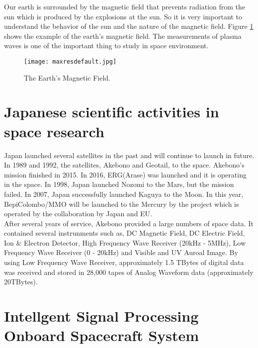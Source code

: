 Our earth is surrounded by the magnetic field that prevents radiation from the sun which is produced by the explosions at the sun. So it is very important to understand the behavior of the sun and the nature of the magnetic field. Figure \ref{fig:magField} shows the example of the earth's magnetic field. The measurements of plasma waves is one of the important thing to study in space environment.\\
\begin{figure}[h!]
  \texttt{[image: maxresdefault.jpg]}
  \caption{The Earth's Magnetic Field.}
  \label{fig:magField}
   \cite{magEarth}
\end{figure}

\section*{Japanese scientific activities in space research}
Japan launched several satellites in the past and will continue to launch in future. In 1989 and 1992, the satellites, Akebono and Geotail, to the space. Akebono's mission finished in 2015. In 2016, ERG(Arase) was launched and it is operating in the space. In 1998, Japan launched Nozomi to the Mars, but the mission failed. In 2007, Japan successfully launched Kaguya to the Moon. In this year, BepiColombo/MMO will be launched to the Mercury by the project which is operated by the collaboration by Japan and EU\cite{lecture}.\\
After several years of service, Akebono provided a large numbers of space data. It contained several instrunments such as, DC Magnetic Field, DC Electric Field, Ion \& Electron Detector, High Frequency Wave Receiver (20kHz - 5MHz), Low Frequency Wave Receiver (0 - 20kHz) and Visible and UV Auroal Image. By using Low Frequency Wave Receiver, approximately 1.5 TBytes of digital data was received and stored in 28,000 tapes of Analog Waveform data (approximately 20TBytes)\cite{lecture}.\\

\section*{Intellgent Signal Processing Onboard Spacecraft System}
